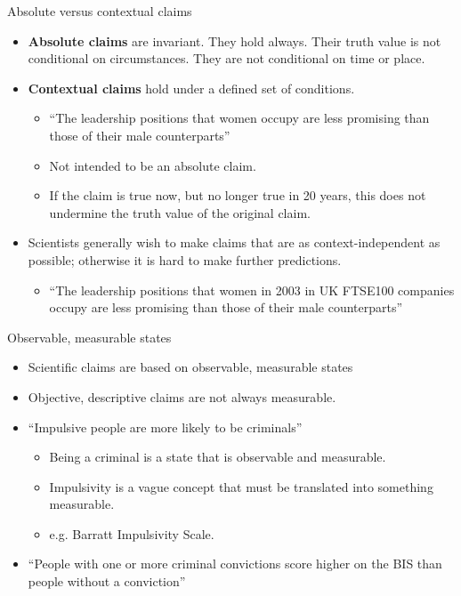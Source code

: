 \documentclass{beamer}
\begin{document}
\begin{frame}{Absolute versus contextual claims}
	\begin{itemize}	
		\item 	\textbf{Absolute claims} are invariant. They hold always. Their truth value is not conditional on circumstances. They are not conditional on time or place.
		\item \textbf{Contextual claims} hold under a defined set of conditions.
		\begin{itemize}
			\item ``The leadership positions that women occupy are less promising than those of their male counterparts''
			\item Not intended to be an absolute claim.
			\item If the claim is true now, but no longer true in 20 years, this does not undermine the truth value of the original claim.
		\end{itemize}
		\item Scientists generally wish to make claims that are as context-independent as possible; otherwise it is hard to make further predictions.
		\begin{itemize}
			\item ``The leadership positions that women in 2003 in UK FTSE100 companies occupy are less promising than those of their male counterparts''
		\end{itemize}
	\end{itemize}
\end{frame}

\begin{frame}{Observable, measurable states}
	\begin{itemize}
		\item Scientific claims are based on observable, measurable states
		\item Objective, descriptive claims are not always measurable.
		\item ``Impulsive people are more likely to be criminals''
		\begin{itemize}
			\item Being a criminal is a state that is observable and measurable.
			\item Impulsivity is a vague concept that must be translated into something measurable.
			\item e.g. Barratt Impulsivity Scale.
		\end{itemize}
		\item ``People with one or more criminal convictions score higher on the BIS than people without a conviction''
	\end{itemize}
\end{frame}
\end{document}
